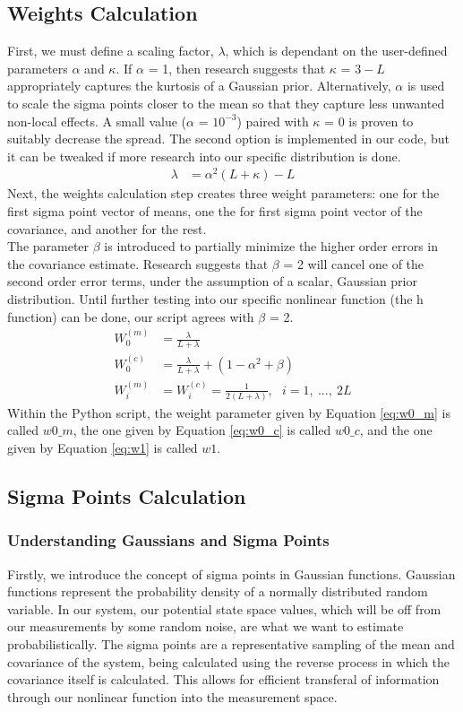 \documentclass{article}
\begin{document}
\subsection{Weights Calculation}
First, we must define a scaling factor, $\lambda$, which is dependant on the user-defined parameters $\alpha$ and $\kappa$. If $\alpha$ = 1, then research \cite{UKF_smoothing} suggests that $\kappa$ = $3 - L$ appropriately captures the kurtosis of a Gaussian prior. Alternatively, $\alpha$ is used to scale the sigma points closer to the mean so that they capture less unwanted non-local effects. A small value ($\alpha$ = $10^{-3}$) paired with $\kappa$ = 0 is proven to suitably decrease the spread. The second option is implemented in our code, but it can be tweaked if more research into our specific distribution is done. 
\begin{align}
    \lambda &= \alpha^2(L + \kappa) - L \label{eq:lambda}
\end{align}
Next, the weights calculation step creates three weight parameters: one for the first sigma point vector of means, one the for first sigma point vector of the covariance, and another for the rest. \\
The parameter $\beta$ is introduced to partially minimize the higher order errors in the covariance estimate. Research \cite{UKF_smoothing} suggests that $\beta$ = 2 will cancel one of the second order error terms, under the assumption of a scalar, Gaussian prior distribution. Until further testing into our specific nonlinear function (the h function) can be done, our script agrees with $\beta$ = 2.
\begin{align}
    W_0^{(m)} &= \frac{\lambda}{L + \lambda} \label{eq:w0_m}\\
    W_0^{(c)} &= \frac{\lambda}{L + \lambda} + (1 - \alpha^2 + \beta) \label{eq:w0_c}\\
    W_i^{(m)} &= W_i^{(c)} = \frac{1}{2(L + \lambda)},~~~ i = 1,~...,~2L \label{eq:w1}
\end{align}
Within the Python script, the weight parameter given by Equation \ref{eq:w0_m} is called $w0\_m$, the one given by Equation \ref{eq:w0_c} is called $w0\_c$, and the one given by Equation \ref{eq:w1} is called $w1$.

\subsection{Sigma Points Calculation}
\subsubsection{Understanding Gaussians and Sigma Points}
Firstly, we introduce the concept of sigma points in Gaussian functions. Gaussian functions represent the probability density of a normally distributed random variable. In our system, our potential state space values, which will be off from our measurements by some random noise, are what we want to estimate probabilistically. The sigma points are a representative sampling of the mean and covariance of the system, being calculated using the reverse process in which the covariance itself is calculated. This allows for efficient transferal of information through our nonlinear function into the measurement space.
\end{document}
